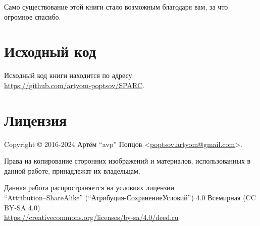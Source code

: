 \documentclass[../sparc.tex]{subfiles}
\begin{document}
Само существование этой книги стало возможным благодаря вам, за что огромное
спасибо.

\section*{Исходный код}

Исходный код книги находится по адресу: \\
\url{https://github.com/artyom-poptsov/SPARC}.

\section*{Лицензия}

Copyright © 2016-2024 Артём ``avp'' Попцов <\href{mailto:poptsov.artyom@gmail.com}{poptsov.artyom@gmail.com}>.

Права на копирование сторонних изображений и материалов, использованных в данной
работе, принадлежат их владельцам.

Данная работа распространяется на условиях лицензии
\\ ``Attribution--ShareAlike'' (``Атрибуция-СохранениеУсловий'') 4.0 Всемирная
(CC BY-SA 4.0) \\ \url{https://creativecommons.org/licenses/by-sa/4.0/deed.ru}
\end{document}

